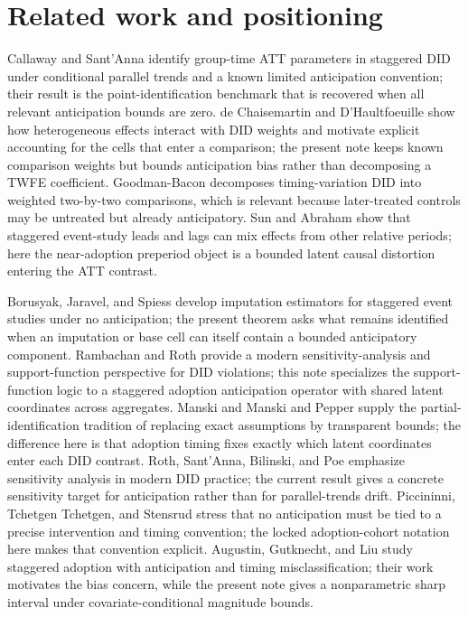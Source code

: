 \documentclass[11pt]{article}
\theoremstyle{definition}
\theoremstyle{plain}
\theoremstyle{remark}
\begin{document}
\section{Related work and positioning}
Callaway and Sant'Anna \cite{CallawaySantAnna2021} identify group-time ATT
parameters in staggered DID under conditional parallel trends and a known limited
anticipation convention; their result is the point-identification benchmark that
is recovered when all relevant anticipation bounds are zero.  de Chaisemartin and
D'Haultfoeuille \cite{DCDH2020} show how heterogeneous effects interact with DID
weights and motivate explicit accounting for the cells that enter a comparison;
the present note keeps known comparison weights but bounds anticipation bias
rather than decomposing a TWFE coefficient.  Goodman-Bacon
\cite{GoodmanBacon2021} decomposes timing-variation DID into weighted two-by-two
comparisons, which is relevant because later-treated controls may be untreated but
already anticipatory.  Sun and Abraham \cite{SunAbraham2021} show that staggered
event-study leads and lags can mix effects from other relative periods; here the
near-adoption preperiod object is a bounded latent causal distortion entering the
ATT contrast.

Borusyak, Jaravel, and Spiess \cite{BorusyakJaravelSpiess2024} develop imputation
estimators for staggered event studies under no anticipation; the present theorem
asks what remains identified when an imputation or base cell can itself contain a
bounded anticipatory component.  Rambachan and Roth \cite{RambachanRoth2023}
provide a modern sensitivity-analysis and support-function perspective for DID
violations; this note specializes the support-function logic to a staggered
adoption anticipation operator with shared latent coordinates across aggregates.
Manski \cite{Manski1990,Manski2003} and Manski and Pepper
\cite{ManskiPepper2018} supply the partial-identification tradition of replacing
exact assumptions by transparent bounds; the difference here is that adoption
timing fixes exactly which latent coordinates enter each DID contrast.  Roth,
Sant'Anna, Bilinski, and Poe \cite{RothSantAnnaBilinskiPoe2023} emphasize
sensitivity analysis in modern DID practice; the current result gives a concrete
sensitivity target for anticipation rather than for parallel-trends drift.
Piccininni, Tchetgen Tchetgen, and Stensrud
\cite{PiccininniTchetgenStensrud2025} stress that no anticipation must be tied to
a precise intervention and timing convention; the locked adoption-cohort
notation here makes that convention explicit.  Augustin, Gutknecht, and Liu
\cite{AugustinGutknechtLiu2025} study staggered adoption with anticipation and
timing misclassification; their work motivates the bias concern, while the
present note gives a nonparametric sharp interval under covariate-conditional
magnitude bounds.
\end{document}
